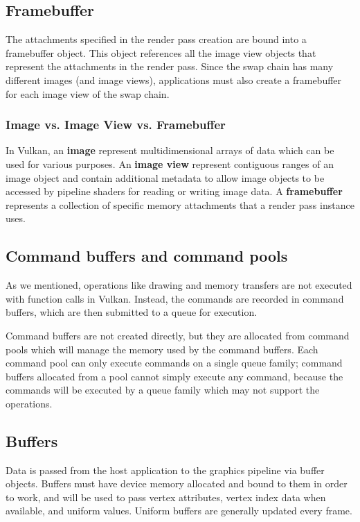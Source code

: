 \subsection{Framebuffer}
The attachments specified in the render pass creation are bound into a framebuffer object. This object references all the image view objects that represent the attachments in the render pass. Since the swap chain has many different images (and image views), applications must also create a framebuffer for each image view of the swap chain.

\subsubsection{Image vs. Image View vs. Framebuffer}
In Vulkan, an \textbf{image} represent multidimensional arrays of data which can be used for various purposes.
An \textbf{image view} represent contiguous ranges of an image object and contain additional metadata to allow image objects to be accessed by pipeline shaders for reading or writing image data.
A \textbf{framebuffer} represents a collection of specific memory attachments that a render pass instance uses.

\subsection{Command buffers and command pools}
As we mentioned, operations like drawing and memory transfers are not executed with function calls in Vulkan. Instead, the commands are recorded in command buffers, which are then submitted to a queue for execution.

Command buffers are not created directly, but they are allocated from command pools which will manage the memory used by the command buffers. Each command pool can only execute commands on a single queue family; command buffers allocated from a pool cannot simply execute any command, because the commands will be executed by a queue family which may not support the operations.

\subsection{Buffers}
Data is passed from the host application to the graphics pipeline via buffer objects. Buffers must have device memory allocated and bound to them in order to work, and will be used to pass vertex attributes, vertex index data when available, and uniform values. Uniform buffers are generally updated every frame.

